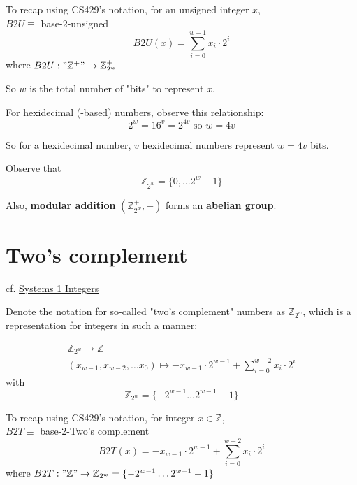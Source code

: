 \documentclass[10pt]{amsart}
\begin{document}
\begin{multicols*}{2}
To recap using CS429's notation, for an unsigned integer $x$, \\
$B2U \equiv $ base-2-unsigned \\
\[
B2U(x) = \sum_{i=0}^{w-1} x_i \cdot 2^i 
\]
where $B2U : "\mathbb{Z}^+" \to \mathbb{Z}^+_{2^w}$

So $w$ is the total number of "bits" to represent $x$.


For hexidecimal (-based) numbers, observe this relationship: 
\begin{equation}
2^w = 16^v = 2^{4v} \text{ so } w =4v
\end{equation}

So for a hexidecimal number, $v$ hexidecimal numbers represent $w=4v$ bits. 

Observe that 
\begin{equation}
\mathbb{Z}^+_{2^w} = \lbrace 0 , \dots 2^w - 1 \rbrace 
\end{equation}

Also, \textbf{modular addition} $(\mathbb{Z}^+_{2^w}, +)$ forms an \textbf{abelian group}.

\section{Two's complement}

cf. \href{https://www.cs.utexas.edu/users/fussell/courses/cs429h/lectures/Lecture_3-429h.pdf}{Systems 1 Integers}

Denote the notation for so-called "two's complement" numbers as $\mathbb{Z}_{2^w}$, which is a representation for integers in such a manner:

\begin{equation}
\begin{gathered}
\mathbb{Z}_{2^w} \to \mathbb{Z} \\
(x_{w-1}, x_{w-2}, \dots x_0) \mapsto -x_{w-1} \cdot 2^{w-1} + \sum_{i=0}^{w-2} x_i \cdot 2^i
\end{gathered}
\end{equation}
with
\begin{equation}
\mathbb{Z}_{2^w} = \lbrace - 2^{w-1} \dots 2^{w-1} -1 \rbrace
\end{equation}

To recap using CS429's notation, for integer $x \in \mathbb{Z}$, \\
$B2T \equiv $ base-2-Two's complement \\
\[
B2T(x) = -x_{w-1} \cdot 2^{w-1} + \sum_{i=0}^{w-2} x_i \cdot 2^i
\]
where $B2T: "\mathbb{Z}" \to \mathbb{Z}_{2^w} = \lbrace -2^{w-1} \dots 2^{w-1} - 1 \rbrace$


\end{multicols*}
\end{document}
